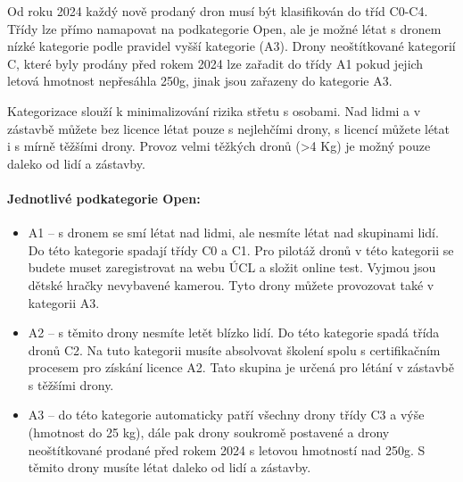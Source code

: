 Od roku 2024 každý nově prodaný dron musí být klasifikován do tříd C0-C4. Třídy lze přímo namapovat na podkategorie Open, ale je možné létat s dronem nízké kategorie podle pravidel vyšší kategorie (A3). Drony neoštítkované kategorií C, které byly prodány před rokem 2024 lze zařadit do třídy A1 pokud jejich letová hmotnost nepřesáhla 250g, jinak jsou zařazeny do kategorie A3.

Kategorizace slouží k minimalizování rizika střetu s osobami. Nad lidmi a v zástavbě můžete bez licence létat pouze s nejlehčími drony, s licencí můžete létat i s mírně těžšími drony. Provoz velmi těžkých dronů (>4 Kg) je možný pouze daleko od lidí a zástavby. 

\paragraph{Jednotlivé podkategorie Open:}
\begin{itemize}
    \item A1 -- s dronem se smí létat nad lidmi, ale nesmíte létat nad skupinami lidí. Do této kategorie spadají třídy C0 a C1. Pro pilotáž dronů v této kategorii se budete muset zaregistrovat na webu ÚCL a složit online test. Vyjmou jsou dětské hračky nevybavené kamerou. Tyto drony můžete provozovat také v kategorii A3.

    \item A2 -- s těmito drony nesmíte letět blízko lidí. Do této kategorie spadá třída dronů C2. Na tuto kategorii musíte absolvovat školení spolu s certifikačním procesem pro získání licence A2. Tato skupina je určená pro létání v zástavbě s těžšími drony.
    \item A3 -- do této kategorie automaticky patří všechny drony třídy C3 a výše (hmotnost do 25 kg), dále pak drony soukromě postavené a drony neoštítkované prodané před rokem 2024 s letovou hmotností nad 250g. S těmito drony musíte létat daleko od lidí a zástavby.
\end{itemize}

